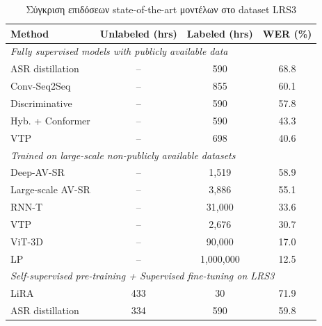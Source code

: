 \begin{table}[h]
\centering
\caption{Σύγκριση επιδόσεων state-of-the-art μοντέλων στο dataset LRS3}
\label{tab:sota_comparison}
\begin{tabular}{l c c c}
\toprule
\textbf{Method} & \textbf{Unlabeled (hrs)} & \textbf{Labeled (hrs)} & \textbf{WER (\%)} \\
\midrule
\multicolumn{4}{l}{\textit{Fully supervised models with publicly available data}} \\
\midrule
ASR distillation \cite{afouras2020asrneedcrossmodaldistillation}        & --      & 590     & 68.8 \\
Conv-Seq2Seq \cite{9009091}          & --      & 855     & 60.1 \\
Discriminative \cite{xu2020discriminativemultimodalityspeechrecognition}    & --      & 590     & 57.8 \\
Hyb. + Conformer \cite{petridis2018endtoendaudiovisualspeechrecognition}       & --      & 590     & 43.3 \\
VTP \cite{prajwal2021subwordlevellipreading}                  & --      & 698     & 40.6 \\
\midrule
\multicolumn{4}{l}{\textit{Trained on large-scale non-publicly available datasets}} \\
\midrule
Deep-AV-SR \cite{Afouras_2022}              & --        & 1{,}519       & 58.9 \\
Large-scale AV-SR \cite{shillingford2018largescalevisualspeechrecognition}      & --        & 3{,}886       & 55.1 \\
RNN-T \cite{makino2019recurrentneuralnetworktransducer}                 & --        & 31{,}000      & 33.6 \\
VTP \cite{prajwal2021subwordlevellipreading}                    & --        & 2{,}676       & 30.7 \\
ViT-3D \cite{serdyuk2022transformerbasedvideofrontendsaudiovisual}                 & --        & 90{,}000      & 17.0 \\
LP \cite{chang2023conformersneedvisualspeech}                      & --        & 1{,}000{,}000 & 12.5 \\
\midrule
\multicolumn{4}{l}{\textit{Self-supervised pre-training + Supervised fine-tuning on LRS3}} \\
\midrule
LiRA \cite{ma2021liralearningvisualspeech}                   & 433       & 30    & 71.9 \\
ASR distillation \cite{afouras2020asrneedcrossmodaldistillation}        & 334       & 590   & 59.8 \\

\end{tabular}
\end{table}
